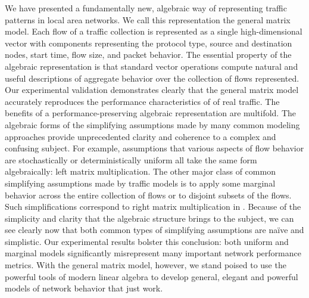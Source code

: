 \documentclass[twocolumn,final]{svjour3}
\newcommand{\caps}[1]{{\smaller{#1}}}
\begin{document}
We have presented a fundamentally new, algebraic way of representing traffic patterns in local area networks. We call this representation the general matrix model. Each flow of a traffic collection is represented as a single high-dimensional vector with components representing the \caps{IP} protocol type, source and destination nodes, start time, flow size, and packet behavior. The essential property of the algebraic representation is that standard vector operations compute natural and useful descriptions of aggregate behavior over the collection of flows represented. Our experimental validation demonstrates clearly that the general matrix model accurately reproduces the performance characteristics of of real traffic. The benefits of a performance-preserving algebraic representation are multifold. The algebraic forms of the simplifying assumptions made by many common modeling approaches provide unprecedented clarity and coherence to a complex and confusing subject. For example, assumptions that various aspects of flow behavior are stochastically or deterministically uniform all take the same form algebraically: left matrix multiplication. The other major class of common simplifying assumptions made by traffic models is to apply some marginal behavior across the entire collection of flows or to disjoint subsets of the flows. Such simplifications correspond to right matrix multiplication in \caps{GMM}. Because of the simplicity and clarity that the algebraic structure brings to the subject, we can see clearly now that both common types of simplifying assumptions are na\"ive and simplistic. Our experimental results bolster this conclusion: both uniform and marginal models significantly misrepresent many important network performance metrics. With the general matrix model, however, we stand poised to use the powerful tools of modern linear algebra to develop general, elegant and powerful models of network behavior that just work.
\end{document}
